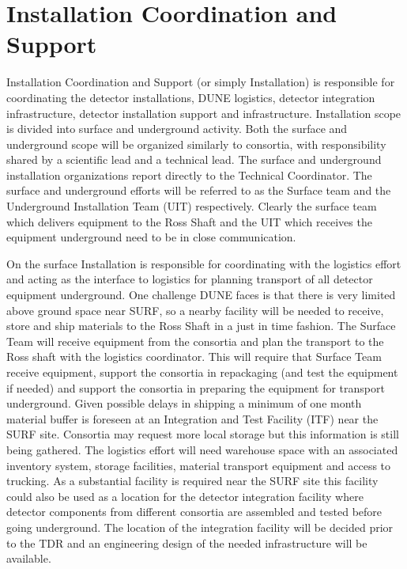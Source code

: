 \section{Installation Coordination and Support}
\label{sec:fdsp-coord-install}


Installation Coordination and Support (or simply Installation) is
responsible for coordinating the detector installations, DUNE
logistics, detector integration infrastructure, detector installation
support and infrastructure. Installation scope is
divided into surface and underground activity. Both the surface and
underground scope will be organized similarly to consortia, with
responsibility shared by a scientific lead and a technical
lead. The surface and
underground installation organizations report directly to the
Technical Coordinator. The surface and underground efforts will be
referred to as the Surface team and the Underground Installation Team
(UIT) respectively. Clearly the surface team which delivers equipment
to the Ross Shaft and the UIT which receives the equipment underground
need to be in close communication.


On the surface Installation is responsible for coordinating with the
 logistics effort and acting as the interface to
 logistics for planning transport of all detector
equipment underground. One challenge DUNE faces is that there is very
limited above ground space near SURF, so a nearby facility will be
needed to receive, store and ship materials to the Ross Shaft in a
just in time fashion. The Surface Team will receive equipment from the
consortia and plan the transport to the Ross shaft with the
 logistics coordinator. This will require that Surface
Team receive equipment, support the consortia in repackaging (and test
the equipment if needed) and support the consortia in preparing the
equipment for transport underground. Given possible delays in shipping
a minimum of one month material buffer is foreseen at an Integration
and Test Facility (ITF) near the SURF site. Consortia may request more
local storage but this information is still being gathered. The
logistics effort will need warehouse space with an associated
inventory system, storage facilities, material transport equipment and
access to trucking. As a substantial facility is required near the
SURF site this facility could also be used as a location for the
detector integration facility where detector components from different
consortia are assembled and tested before going underground. The
location of the integration facility will be decided prior to the TDR
and an engineering design of the needed infrastructure will be
available.

